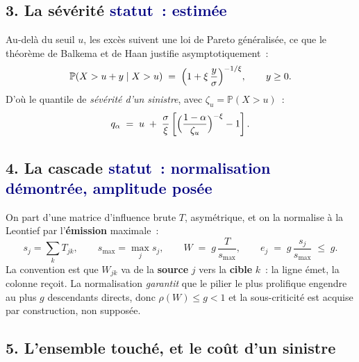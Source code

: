 \subsection*{3. La sévérité \quad\small\textcolor{navy}{statut~: estimée}\normalsize}

Au-delà du seuil $u$, les excès suivent une loi de Pareto généralisée, ce que le théorème de
Balkema et de Haan justifie asymptotiquement~:
\[
\mathbb{P}(X>u+y \mid X>u) \;=\; \Bigl(1+\xi\,\frac{y}{\sigma}\Bigr)^{-1/\xi},
\qquad y\ge 0 .
\]
D'où le quantile de \emph{sévérité d'un sinistre}, avec $\zeta_u=\mathbb{P}(X>u)$~:
\[
q_\alpha \;=\; u \;+\; \frac{\sigma}{\xi}
\left[\Bigl(\frac{1-\alpha}{\zeta_u}\Bigr)^{-\xi}-1\right].
\]

\subsection*{4. La cascade \quad\small\textcolor{navy}{statut~: normalisation démontrée, amplitude posée}\normalsize}

On part d'une matrice d'influence brute $T$, asymétrique, et on la normalise à la
Leontief par l'\textbf{émission} maximale~:
\[
s_j=\sum_k T_{jk}, \qquad s_{\max}=\max_j s_j, \qquad
W \;=\; g\,\frac{T}{s_{\max}}, \qquad
e_j \;=\; g\,\frac{s_j}{s_{\max}} \;\le\; g .
\]
\noindent La convention est que $W_{jk}$ va de la \textbf{source} $j$ vers la \textbf{cible} $k$~:
la ligne émet, la colonne reçoit. La normalisation \emph{garantit} que le pilier le plus prolifique
engendre au plus $g$ descendants directs, donc $\rho(W)\le g<1$ et la sous-criticité est acquise
par construction, non supposée.


\subsection*{5. L'ensemble touché, et le coût d'un sinistre}


